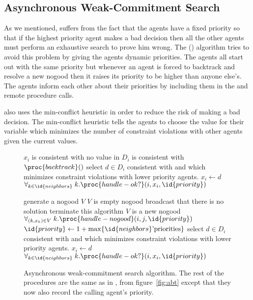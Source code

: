 \subsection{Asynchronous Weak-Commitment Search}

As we mentioned,  suffers from the fact that the agents have
a fixed priority so that if the highest priority agent makes a bad
decision then all the other agents must perform an exhaustive search
to prove him wrong. The  ()
algorithm tries to avoid this problem by giving the agents dynamic
priorities.  The agents all start out with the same priority but
whenever an agent is forced to backtrack and resolve a new nogood then
it raises its priority to be higher than anyone else's. The agents
inform each other about their priorities by including them in the
 and  remote procedure calls.


 also uses the min-conflict heuristic \cite{minton92a} in
order to reduce the risk of making a bad decision.  The min-conflict
heuristic tells the agents to choose the value for their variable
which minimizes the number of constraint violations with other agents
given the current values.


\begin{SCfigure}
  \begin{minipage}{1.0\linewidth}
  \begin{codebox}
    \li \If $x_i$ is consistent with 
    \li \Then \Return
    \End
    \li \If no value in $D_i$ is consistent with 
    \li \Then $\proc{backtrack}()$
    \li \Else select $d \in D_i$ consistent with  and
    which minimizes constraint 
    \zi \>\>\>\>violations with lower priority agents.
    \li       $x_i \gets d$
    \li       $\forall_{k \in \id{neighbors}} \; k.\proc{handle-ok?}(i, x_i, \id{priority})$
    \End
  \end{codebox}
  \begin{codebox}
    \li generate a nogood $V$
    \li \If $V$ is empty nogood
    \li \Then broadcast that there is no solution
    \li       terminate this algorithm
    \End
    \li \If $V$ is a new nogood
    \li \Then $\forall_{(k,x_k) \in V} \; k.\proc{handle-nogood}(i,j,\id{priority})$
    \li       $\id{priority} \gets 1 + \max \{\id{neighbors}\text{'} \text{priorities}\}$
    \li       select $d \in D_i$ consistent with  and
    which minimizes constraint 
    \zi \>\>\>\> violations with lower priority agents.        
    \li       $x_i \gets d$
    \li       $\forall_{k \in \id{neighbors}} \; k.\proc{handle-ok?}(i, x_i, \id{priority})$
    \End
  \end{codebox}
  \end{minipage}
  \caption{Asynchronous weak-commitment search algorithm. The rest of
    the procedures are the same as in , from
    figure~\ref{fig:abt} except that they now also record the calling
    agent's priority.}
  \label{fig:awc}
\end{SCfigure}


